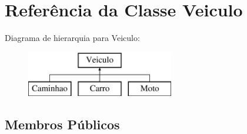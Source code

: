 \hypertarget{class_veiculo}{}\section{Referência da Classe Veiculo}
\label{class_veiculo}
Diagrama de hierarquia para Veiculo\+:\begin{figure}[H]
\begin{center}
\leavevmode
\includegraphics[height=2.000000cm]{class_veiculo}
\end{center}
\end{figure}
\subsection*{Membros Públicos}
